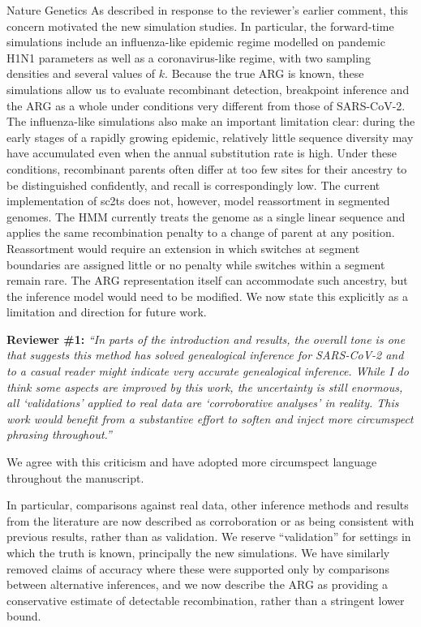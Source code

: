 \documentclass{letter}
\begin{document}
\begin{letter}{Nature Genetics}
As described in response to the reviewer’s earlier comment, this concern
motivated the new simulation studies. In particular, the forward-time
simulations include an influenza-like epidemic regime modelled on pandemic H1N1
parameters as well as a coronavirus-like regime, with two sampling densities
and several values of $k$. Because the true ARG is known, these simulations allow
us to evaluate recombinant detection, breakpoint inference and the ARG as a
whole under conditions very different from those of SARS-CoV-2. The
influenza-like simulations also make an important limitation clear: during the
early stages of a rapidly growing epidemic, relatively little sequence
diversity may have accumulated even when the annual substitution rate is high.
Under these conditions, recombinant parents often differ at too few sites for
their ancestry to be distinguished confidently, and recall is correspondingly
low.
The current implementation of sc2ts does not, however, model reassortment
in segmented genomes. The HMM currently treats the genome as a single linear
sequence and applies the same recombination penalty to a change of parent at
any position. Reassortment would require an extension in which switches at
segment boundaries are assigned little or no penalty while switches within a
segment remain rare. The ARG representation itself can accommodate such
ancestry, but the inference model would need to be modified. We now state this
explicitly as a limitation and direction for future work.


\noindent \textbf{Reviewer \#1:} \textit{``In parts of the introduction and results,
the overall tone is one that suggests this method has solved genealogical
inference for SARS-CoV-2 and to a casual reader might indicate very accurate
genealogical inference. While I do think some aspects are improved by this
work, the uncertainty is still enormous, all `validations' applied to real
data are `corroborative analyses' in reality. This work would benefit from a
substantive effort to soften and inject more circumspect phrasing
throughout.''}

We agree with this criticism and have adopted more circumspect language
throughout the manuscript.

In particular, comparisons against real data, other inference methods and
results from the literature are now described as corroboration or as being
consistent with previous results, rather than as validation. We reserve
``validation'' for settings in which the truth is known,
principally the new simulations. We have similarly
removed claims of accuracy where these were supported only by comparisons
between alternative inferences, and we now describe the ARG as providing a
conservative estimate of detectable recombination, rather than a stringent
lower bound.


\end{letter}
\end{document}
